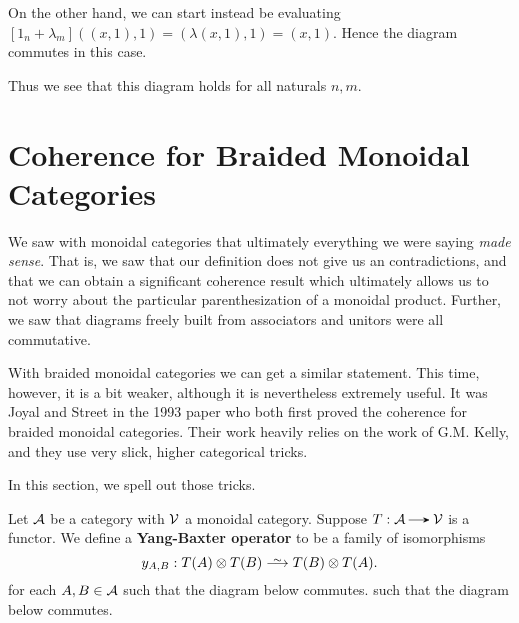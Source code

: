 \begin{example}
\begin{description}
        On the other hand, we can start instead be evaluating 
        $[1_n + \lambda_m]((x, 1), 1) = (\lambda(x, 1), 1) = (x, 1)$. Hence the diagram commutes 
        in this case.
    \end{description}
    Thus we see that this diagram holds for all naturals $n, m$.
\end{example}

\newpage
\section{Coherence for Braided Monoidal Categories}
We saw with monoidal categories that ultimately everything we were saying \emph{made sense}. 
That is, we saw that our definition does not give us an contradictions, and that we 
can obtain a significant coherence result which ultimately allows us to not worry 
about the particular parenthesization of a monoidal product. Further, we saw that 
diagrams freely built from associators and unitors were all commutative. 

With braided monoidal categories we can get a similar statement. This time, however, 
it is a bit weaker, although it is nevertheless extremely useful. It was Joyal and Street 
in the 1993 paper who both first proved the coherence for braided monoidal categories. 
Their work heavily relies on the work of G.M. Kelly, and they use very slick, 
higher categorical tricks.
 
In this section, we spell out those tricks. 

\begin{definition}
    Let $\aa$ be a category with $\vv$ a monoidal category. Suppose $T: \aa \to \vv$ is a functor.
    We define a \textbf{Yang-Baxter operator}
    to be a family of isomorphisms
    \[
        y_{A,B}: T(A)\otimes T(B) \isomarrow T(B) \otimes T(A).
    \]
    for each $A, B \in \aa$ such that the diagram below commutes.
    such that the diagram below commutes.
\end{definition}

\begin{center}
\end{center}

